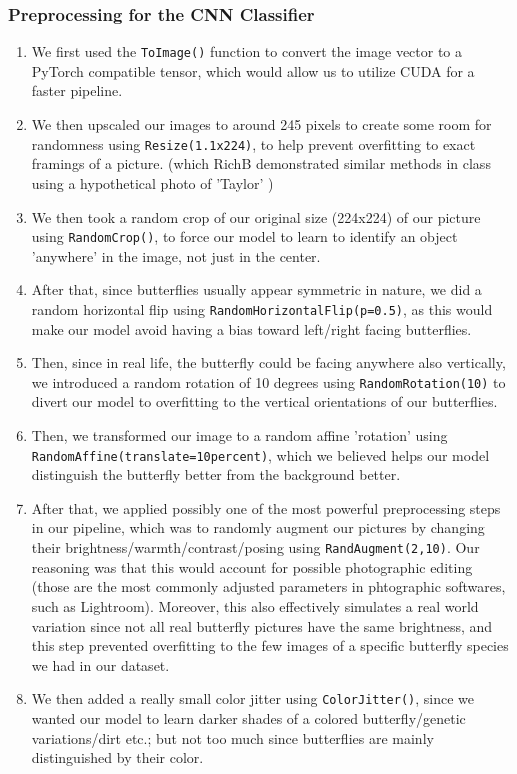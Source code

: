 \documentclass[10pt]{article} %
\begin{document}
\subsubsection{Preprocessing for the CNN Classifier}\begin{enumerate}
    \item We first used the \texttt{ToImage()} function to convert the image vector to a PyTorch compatible tensor, which would allow us to utilize CUDA for a faster pipeline.
    \item We then upscaled our images to around 245 pixels to create some room for randomness using \texttt{Resize(1.1x224)}, to help prevent overfitting to exact framings of a picture. (which RichB demonstrated similar methods in class using a hypothetical photo of 'Taylor' )
    \item We then took a random crop of our original size (224x224) of our picture using \texttt{RandomCrop()}, to force our model to learn to identify an object 'anywhere' in the image, not just in the center.
    \item After that, since butterflies usually appear symmetric in nature, we did a random horizontal flip using \texttt{RandomHorizontalFlip(p=0.5)}, as this would make our model avoid having a bias toward left/right facing butterflies.
    \item Then, since in real life, the butterfly could be facing anywhere also vertically, we introduced a random rotation of 10 degrees using \texttt{RandomRotation(10)} to divert our model to overfitting to the vertical orientations of our butterflies.
    \item Then, we transformed our image to a random affine 'rotation' using \texttt{RandomAffine(translate=10percent)}, which we believed helps our model distinguish the butterfly better from the background better.
    \item After that, we applied possibly one of the most powerful preprocessing steps in our pipeline, which was to randomly augment our pictures by changing their brightness/warmth/contrast/posing using \texttt{RandAugment(2,10)}. Our reasoning was that this would account for possible photographic editing (those are the most commonly adjusted parameters in phtographic softwares, such as Lightroom). Moreover, this also effectively simulates a real world variation since not all real butterfly pictures have the same brightness, and this step prevented overfitting to the few images of a specific butterfly species we had in our dataset.
    \item We then added a really small color jitter using \texttt{ColorJitter()}, since we wanted our model to learn darker shades of a colored butterfly/genetic variations/dirt etc.; but not too much since butterflies are mainly distinguished by their color.

\end{enumerate}
\end{document}
